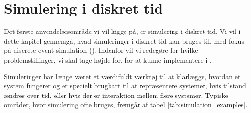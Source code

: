 \chapter{Simulering i diskret tid}
\label{chap:des}
Det første anvendelsesområde vi vil kigge på, er simulering i diskret tid. Vi vil i dette kapitel gennemgå, hvad simuleringer i diskret tid kan bruges til, med fokus på discrete event simulation (\des). Indenfor \des vil vi redegøre for hvilke problemstillinger, vi skal tage højde for, for at kunne implementere \des i \pycsp. 

Simuleringer har længe været et værdifuldt værktøj til at klarlægge, hvordan et system fungerer og er specielt brugbart til at repræsentere systemer, hvis 
tilstand ændres over tid, eller hvis der er interaktion mellem flere systemer. Typiske områder, hvor simulering ofte bruges, fremgår af tabel \ref{tab:simulation_examples}. 

